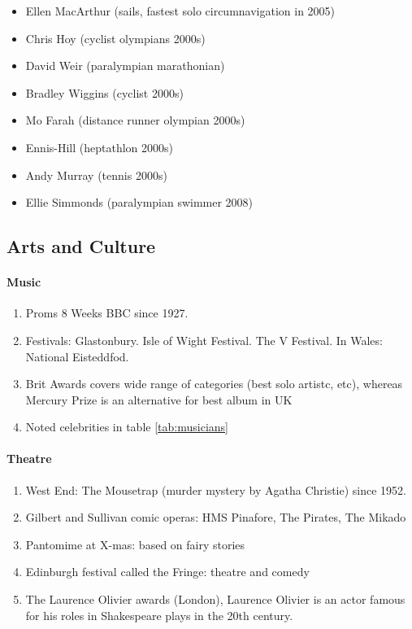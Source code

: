 \documentclass{amsart}
\begin{document}
\begin{enumerate}
\begin{itemize}
			\item Ellen MacArthur (sails, fastest solo circumnavigation in 2005)
			\item Chris Hoy (cyclist olympians 2000s)
			\item David Weir (paralympian marathonian)
			\item Bradley Wiggins (cyclist 2000s)
			\item Mo Farah (distance runner olympian 2000s)
			\item Ennis-Hill (heptathlon 2000s)
			\item Andy Murray (tennis 2000s)
			\item Ellie Simmonds (paralympian swimmer 2008)
		\end{itemize}
\end{enumerate}

\subsection{Arts and Culture}

\paragraph{Music}

\begin{enumerate}
\item Proms 8 Weeks BBC since 1927.
\item Festivals: Glastonbury. Isle of Wight Festival. The V Festival. 
In Wales: National Eisteddfod. 
\item  Brit Awards covers wide range of categories (best solo artistc, etc), whereas Mercury Prize is an alternative for best album in UK
\item Noted celebrities in table \ref{tab:musicians}
\end{enumerate}




\paragraph{Theatre}

\begin{enumerate}
\item West End: The Mousetrap (murder mystery by Agatha Christie) since 1952.
\item Gilbert and Sullivan comic operas: HMS Pinafore, The Pirates, The Mikado
\item Pantomime at X-mas: based on fairy stories 
\item Edinburgh festival called the Fringe: theatre and comedy
\item The Laurence Olivier awards (London), Laurence Olivier is an actor famous for his roles in Shakespeare plays in the 20th century.
\end{enumerate}
\end{document}
